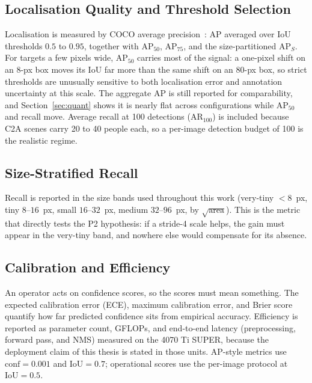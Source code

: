 \subsection{Localisation Quality and Threshold Selection}
Localisation is measured by COCO average precision~\cite{lin2014coco}:
$\mathrm{AP}$ averaged
over IoU thresholds $0.5$ to $0.95$, together with $\mathrm{AP}_{50}$,
$\mathrm{AP}_{75}$, and the size-partitioned $\mathrm{AP}_S$. For targets a
few pixels wide, $\mathrm{AP}_{50}$ carries most of the signal: a one-pixel
shift on an 8-px box moves its IoU far more than the same shift on an 80-px
box, so strict thresholds are unusually sensitive to both localisation error
and annotation uncertainty at this scale. The aggregate AP is still reported for
comparability, and Section~\ref{sec:quant} shows it is nearly flat across
configurations while $\mathrm{AP}_{50}$ and recall move. Average recall at
100 detections ($\mathrm{AR}_{100}$) is included because C2A scenes carry 20
to 40 people each, so a per-image detection budget of 100 is the realistic
regime.

\subsection{Size-Stratified Recall}
Recall is reported in the size bands used throughout this work (very-tiny
$<8$~px, tiny $8$--$16$~px, small $16$--$32$~px, medium $32$--$96$~px, by
$\sqrt{\text{area}}$). This is the metric that directly tests the P2
hypothesis: if a stride-4 scale helps, the gain must appear in the very-tiny
band, and nowhere else would compensate for its absence.

\subsection{Calibration and Efficiency}
An operator acts on confidence scores, so the scores must mean something. The
expected calibration error (ECE), maximum calibration error, and Brier score
quantify how far predicted confidence sits from empirical accuracy.
Efficiency is reported as parameter count, GFLOPs, and end-to-end latency
(preprocessing, forward pass, and NMS) measured on the 4070 Ti SUPER, because
the deployment claim of this thesis is stated in those units. AP-style
metrics use $\text{conf} = 0.001$ and $\text{IoU} = 0.7$; operational scores
use the per-image protocol at $\text{IoU} = 0.5$.

